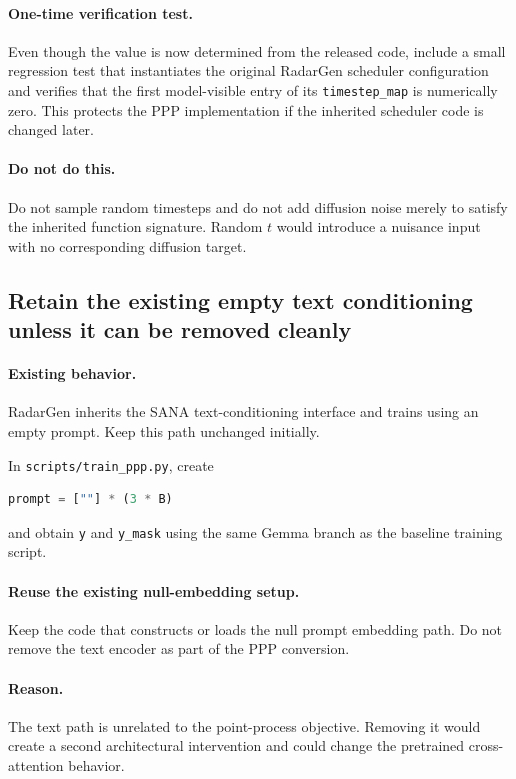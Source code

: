 \documentclass[11pt,a4paper]{article}
\begin{document}
\paragraph{One-time verification test.}
Even though the value is now determined from the released code, include a small regression test that instantiates the original RadarGen scheduler configuration and verifies that the first model-visible entry of its \texttt{timestep\_map} is numerically zero. This protects the PPP implementation if the inherited scheduler code is changed later.

\paragraph{Do not do this.}
Do not sample random timesteps and do not add diffusion noise merely to satisfy the inherited function signature. Random \(t\) would introduce a nuisance input with no corresponding diffusion target.

\subsection{Retain the existing empty text conditioning unless it can be removed cleanly}

\paragraph{Existing behavior.}
RadarGen inherits the SANA text-conditioning interface and trains using an empty prompt. Keep this path unchanged initially.

In \texttt{scripts/train\_ppp.py}, create
\begin{lstlisting}[language=Python]
prompt = [""] * (3 * B)
\end{lstlisting}
and obtain \texttt{y} and \texttt{y\_mask} using the same Gemma branch as the baseline training script.

\paragraph{Reuse the existing null-embedding setup.}
Keep the code that constructs or loads the null prompt embedding path. Do not remove the text encoder as part of the PPP conversion.

\paragraph{Reason.}
The text path is unrelated to the point-process objective. Removing it would create a second architectural intervention and could change the pretrained cross-attention behavior.
\end{document}
